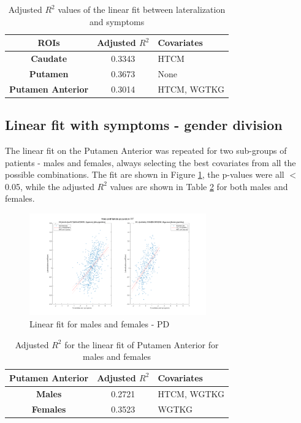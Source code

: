 \documentclass[]{article}
\begin{document}
\begin{table}[h]
	\centering
	\begin{tabular}{|c|c|l|}
		\hline
		\textbf{ROIs}             & \textbf{Adjusted $R^2$} & \textbf{Covariates} \\ \hline
		\textbf{Caudate}          & 0.3343                  & HTCM                \\ \hline
		\textbf{Putamen}          & 0.3673                  & None                \\ \hline
		\textbf{Putamen Anterior} & 0.3014                  & HTCM, WGTKG         \\ \hline
	\end{tabular}
	\caption{Adjusted $R^2$ values of the linear fit between lateralization and symptoms}
	\label{tbl:R_squared_fit_pd}
\end{table}


\begin{multicols}{2}

\subsection{Linear fit with symptoms - gender division}

The linear fit on the Putamen Anterior was repeated for two sub-groups of patients - males and females, always selecting the best covariates from all the possible combinations. The fit are shown in Figure \ref{fig:lin_fit_male_female}, the p-values were all $<$ 0.05, while the adjusted $R^2$ values are shown in Table \ref{tbl:lin_fit_put_ant} for both males and females.

\end{multicols}

\begin{figure}[h]
	\centering
	\includegraphics[width=3in]{../fit_covariates_male_female}
	\caption{Linear fit for males and females - PD}
	\label{fig:lin_fit_male_female}
\end{figure} 

\begin{table}[h]
	\centering
	\begin{tabular}{|c|c|l|}
		\hline
		\textbf{Putamen Anterior} & \textbf{Adjusted $R^2$} & \textbf{Covariates} \\ \hline
		\textbf{Males}            & 0.2721                  & HTCM, WGTKG         \\ \hline
		\textbf{Females}          & 0.3523                  & WGTKG               \\ \hline
	\end{tabular}
	\caption{Adjusted $R^2$ for the linear fit of Putamen Anterior for males and females}
	\label{tbl:lin_fit_put_ant}
\end{table}
\end{document}
